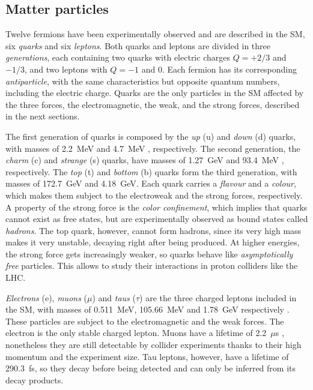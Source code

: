 \documentclass[../main.tex]{subfiles}
\begin{document}
\subsection{Matter particles}

Twelve fermions have been experimentally observed and are described in the SM, six \textit{quarks} and six \textit{leptons}. Both quarks and leptons are divided in three \textit{generations}, each containing two quarks with electric charges $Q=+2/3$ and $-1/3$, and two leptons with $Q=-1$ and $0$. Each fermion has its corresponding \textit{antiparticle}, with the same characteristics but opposite quantum numbers, including the electric charge. Quarks are the only particles in the SM affected by the three forces, the electromagnetic, the weak, and the strong forces, described in the next sections. 

The first generation of quarks is composed by the \textit{up} (u) and \textit{down} (d) quarks, with masses of 2.2~MeV and 4.7~MeV \cite{pdg}, respectively. The second generation, the \textit{charm} (c) and \textit{strange} (s) quarks, have masses of 1.27~GeV and 93.4~MeV \cite{pdg}, respectively. The \textit{top} (t) and \textit{bottom} (b) quarks form the third generation, with masses of 172.7~GeV and 4.18~GeV. Each quark carries a \textit{flavour} and a \textit{colour}, which makes them subject to the electroweak and the strong forces, respectively. A property of the strong force is the \textit{color confinement}, which implies that quarks cannot exist as free states, but are experimentally observed as bound states called \textit{hadrons}. The top quark, however, cannot form hadrons, since its very high mass makes it very unstable, decaying right after being produced. At higher energies, the strong force gets increasingly weaker, so quarks behave like \textit{asymptotically free} particles. This allows to study their interactions in proton colliders like the LHC.


\textit{Electrons} (e), \textit{muons} ($\mu$) and \textit{taus} ($\tau$) are the three charged leptons included in the SM, with masses of 0.511~MeV, 105.66~MeV and 1.78~GeV respectively \cite{pdg}. These particles are subject to the electromagnetic and the weak forces. The electron is the only stable charged lepton. Muons have a lifetime of 2.2~$\mu$s \cite{pdg}, nonetheless they are still detectable by collider experiments thanks to their high momentum and the experiment size. Tau leptons, however, have a lifetime of 290.3~fs, so they decay before being detected and can only be inferred from its decay products.
\end{document}
